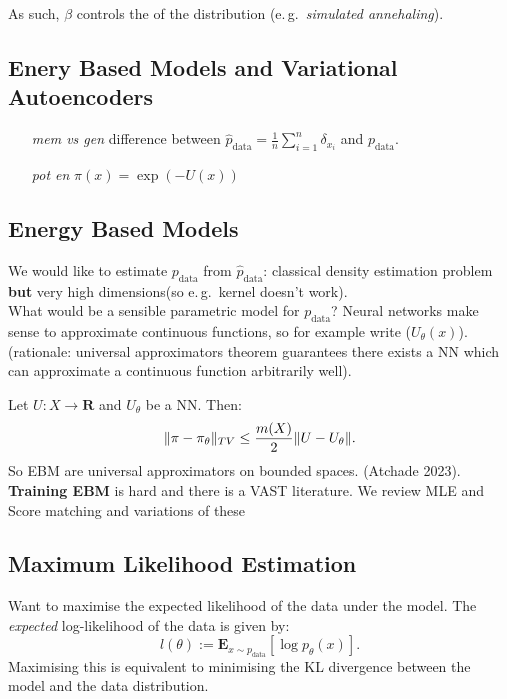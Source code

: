 \documentclass{article}
\DeclarePairedDelimiter{\norm}{\lVert}{\rVert}
\begin{document}
    As such, $\beta$ controls the  of the distribution (e.\,g.\ \textit{simulated annehaling}).

    \subsection{Enery Based Models and Variational Autoencoders}

    \begin{itemize}
        \item[\textit{mem vs gen}] difference between $\hat p_\text{data} = \frac{1}{n} \sum_{i=1}^{n} \delta_{x_i}$ and $p_\text{data}$.
        \item[\textit{pot en}] $\pi(x) = \exp(-U(x))$
    \end{itemize}

    \subsection{Energy Based Models}

    We would like to estimate $p_\text{data}$ from $\hat{p}_\text{data}$: classical density estimation problem \textbf{but} very high dimensions(so e.\,g.\ kernel doesn't work).
\\
    What would be a sensible parametric model for $p_\text{data}$?
    Neural networks make sense to approximate continuous functions, so for example write ($U_{\theta}(x)$). (rationale: universal approximators theorem guarantees there exists a  NN which can approximate a continuous function arbitrarily well).

    Let $U \colon X \to \mathbf{R}$ and $U_{\theta}$ be a NN. Then:
    \begin{equation} \label{eq:}
        \norm{\pi - \pi_{\theta}}_{TV} \leq \frac{m(X)}{2}\norm{U - U_{\theta}}.
    \end{equation}
    So EBM are universal approximators on bounded spaces. (Atchade 2023).
    \textbf{Training EBM} is hard and there is a VAST literature.
    We review MLE and Score matching and variations of these

    \subsection{Maximum Likelihood Estimation}
    Want to maximise the expected likelihood of the data under the model. The \textit{expected} log-likelihood of the data is given by:
    \begin{equation} \label{eq:}
      l(\theta) := \mathbf{E}_{x \sim p_\text{data}} \left[ \log p_{\theta}(x) \right].
    \end{equation}
    Maximising this is equivalent to minimising the KL divergence between the model and the data distribution.
\end{document}
